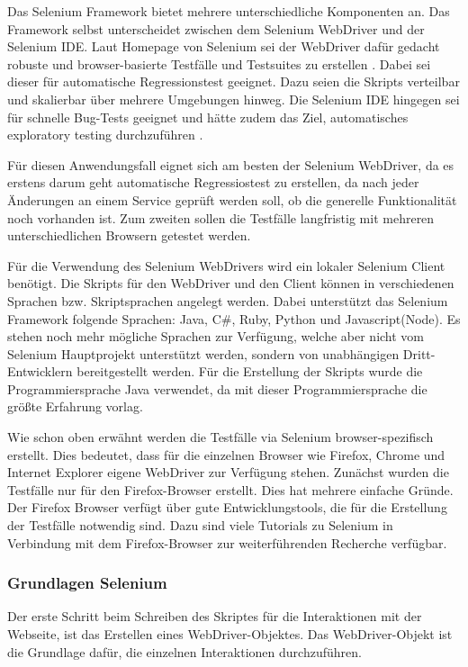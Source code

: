 \documentclass{llncs}
\begin{document}
Das Selenium Framework bietet mehrere unterschiedliche Komponenten an. Das Framework selbst unterscheidet zwischen dem Selenium WebDriver und der Selenium IDE. Laut Homepage von Selenium sei der WebDriver dafür gedacht robuste und browser-basierte Testfälle und Testsuites zu erstellen \cite{selenium}.  Dabei sei dieser für automatische Regressionstest geeignet. Dazu seien die Skripts verteilbar und skalierbar über mehrere Umgebungen hinweg. Die Selenium IDE hingegen sei für schnelle Bug-Tests geeignet und hätte zudem das Ziel, automatisches exploratory testing durchzuführen \cite{selenium}. 

Für diesen Anwendungsfall eignet sich am besten der Selenium WebDriver, da es erstens darum geht automatische Regressiostest zu erstellen, da nach jeder Änderungen an einem Service geprüft werden soll, ob die generelle Funktionalität noch vorhanden ist. Zum zweiten sollen die Testfälle langfristig mit mehreren unterschiedlichen Browsern getestet werden.

Für die Verwendung des Selenium WebDrivers wird ein lokaler Selenium Client benötigt. Die Skripts für den WebDriver und den Client können in verschiedenen Sprachen bzw. Skriptsprachen angelegt werden. Dabei unterstützt das Selenium Framework folgende Sprachen: Java, C\#, Ruby, Python und Javascript(Node). Es stehen noch mehr mögliche Sprachen zur Verfügung, welche aber nicht vom Selenium Hauptprojekt unterstützt werden, sondern von unabhängigen Dritt-Entwicklern bereitgestellt werden. Für die Erstellung der Skripts wurde die Programmiersprache Java verwendet, da mit dieser Programmiersprache die größte Erfahrung vorlag. 

Wie schon oben erwähnt werden die Testfälle via Selenium browser-spezifisch erstellt. Dies bedeutet, dass für die einzelnen Browser wie Firefox, Chrome und Internet Explorer eigene WebDriver zur Verfügung stehen. Zunächst wurden die Testfälle nur für den Firefox-Browser erstellt. Dies hat mehrere einfache Gründe. Der Firefox Browser verfügt über gute Entwicklungstools, die für die Erstellung der Testfälle notwendig sind. Dazu sind viele Tutorials zu Selenium in Verbindung mit dem Firefox-Browser zur weiterführenden Recherche verfügbar.

\subsubsection{Grundlagen Selenium}
Der erste Schritt beim Schreiben des Skriptes für die Interaktionen mit der Webseite, ist das Erstellen eines WebDriver-Objektes. Das WebDriver-Objekt ist die Grundlage dafür, die einzelnen Interaktionen durchzuführen.
\end{document}
